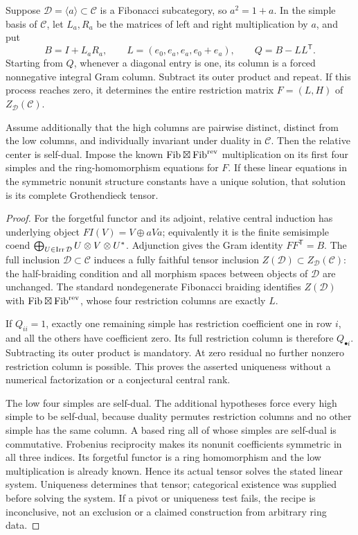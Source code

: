 \begin{proposition}\label{prop:relative-reconstruction}
Suppose $\mathcal D=\langle a\rangle\subset\mathcal C$ is a Fibonacci
subcategory, so $a^2=1+a$. In the simple basis of $\mathcal C$, let $L_a,R_a$
be the matrices of left and right multiplication by $a$, and put
\[
 B=I+L_aR_a,\qquad
 L=(e_0,e_a,e_a,e_0+e_a),\qquad Q=B-LL^{\mathsf T}.
\]
Starting from $Q$, whenever a diagonal entry is one, its column is a
forced nonnegative integral Gram column. Subtract its outer product and
repeat. If this process reaches zero, it determines the entire restriction
matrix $F=(L,H)$ of $Z_{\mathcal D}(\mathcal C)$.

Assume additionally that the high columns are pairwise distinct, distinct
from the low columns, and individually invariant under duality in
$\mathcal C$. Then the relative center is self-dual. Impose the known
$\mathrm{Fib}\boxtimes\mathrm{Fib}^{\rm rev}$ multiplication on its first
four simples and the ring-homomorphism equations for $F$. If these linear
equations in the symmetric nonunit structure constants have a unique
solution, that solution is its complete Grothendieck tensor.
\end{proposition}
\begin{proof}
For the forgetful functor and its adjoint, relative central induction has
underlying object $FI(V)=V\oplus aVa$; equivalently it is the finite
semisimple coend $\bigoplus_{U\in\operatorname{Irr}\mathcal D}U\otimes V\otimes U^*$.
Adjunction gives the Gram identity $FF^{\mathsf T}=B$.
The full inclusion $\mathcal D\subset\mathcal C$ induces a fully faithful
tensor inclusion $Z(\mathcal D)\subset Z_{\mathcal D}(\mathcal C)$:
the half-braiding condition and all morphism spaces between objects of
$\mathcal D$ are unchanged. The standard nondegenerate Fibonacci braiding
identifies $Z(\mathcal D)$ with
$\mathrm{Fib}\boxtimes\mathrm{Fib}^{\rm rev}$, whose four restriction
columns are exactly $L$.

If $Q_{ii}=1$, exactly one remaining simple has restriction coefficient
one in row $i$, and all the others have coefficient zero. Its full
restriction column is therefore $Q_{\bullet i}$. Subtracting its outer
product is mandatory. At zero residual no further nonzero restriction
column is possible. This proves the asserted uniqueness without a
numerical factorization or a conjectural central rank.

The low four simples are self-dual. The additional hypotheses force every
high simple to be self-dual, because duality permutes restriction columns
and no other simple has the same column. A based ring all of whose simples
are self-dual is commutative. Frobenius reciprocity makes its nonunit
coefficients symmetric in all three indices. Its forgetful functor is a
ring homomorphism and the low multiplication is already known. Hence its
actual tensor solves the stated linear system. Uniqueness determines
that tensor; categorical existence was supplied before solving the
system. If a pivot or uniqueness test fails, the recipe is inconclusive,
not an exclusion or a claimed construction from arbitrary ring data.
\end{proof}

